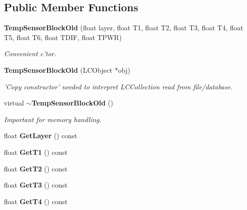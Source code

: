 \subsection*{Public Member Functions}
\begin{DoxyCompactItemize}
\item 
{\bf Temp\-Sensor\-Block\-Old} (float layer, float T1, float T2, float T3, float T4, float T5, float T6, float T\-D\-I\-F, float T\-P\-W\-R)\label{classCALICE_1_1TempSensorBlockOld_a82d44ba02d686f455a449b7973a84458}

\begin{DoxyCompactList}\small\item\em Convenient c'tor. \end{DoxyCompactList}\item 
{\bf Temp\-Sensor\-Block\-Old} (L\-C\-Object $\ast$obj)\label{classCALICE_1_1TempSensorBlockOld_a8fa3c63309c635a015babba9cd9bcc5e}

\begin{DoxyCompactList}\small\item\em 'Copy constructor' needed to interpret L\-C\-Collection read from file/database. \end{DoxyCompactList}\item 
virtual {\bf $\sim$\-Temp\-Sensor\-Block\-Old} ()\label{classCALICE_1_1TempSensorBlockOld_aa38e40270950ded8526b545854977c3c}

\begin{DoxyCompactList}\small\item\em Important for memory handling. \end{DoxyCompactList}\item 
float {\bfseries Get\-Layer} () const \label{classCALICE_1_1TempSensorBlockOld_ae6bf017ac104815ba921e869d089b995}

\item 
float {\bfseries Get\-T1} () const \label{classCALICE_1_1TempSensorBlockOld_a5a7ed17b117faae8ac76b9cc96e13296}

\item 
float {\bfseries Get\-T2} () const \label{classCALICE_1_1TempSensorBlockOld_a4663dda7309826ace2cf5bd61b67e5e0}

\item 
float {\bfseries Get\-T3} () const \label{classCALICE_1_1TempSensorBlockOld_af4a3ebf85837357ca3f779c4f76aec2a}

\item 
float {\bfseries Get\-T4} () const \label{classCALICE_1_1TempSensorBlockOld_a9d33ccb66b6ecc6fd9b09dc3ec74b05e}


\end{DoxyCompactItemize}
